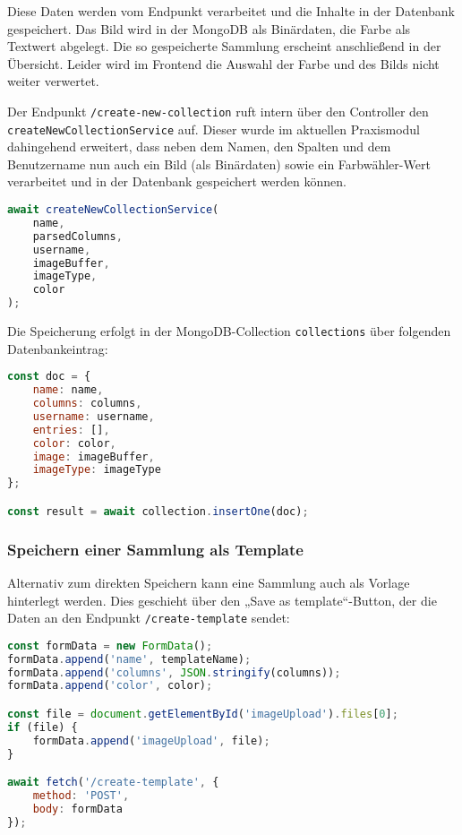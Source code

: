 Diese Daten werden vom Endpunkt  verarbeitet und die Inhalte in der Datenbank gespeichert.
Das Bild wird in der MongoDB als Binärdaten, die Farbe als Textwert abgelegt.
Die so gespeicherte Sammlung erscheint anschließend in der Übersicht.
Leider wird im Frontend die Auswahl der Farbe und des Bilds nicht weiter verwertet.

Der Endpunkt \texttt{/create-new-collection} ruft intern über den Controller den \texttt{createNewCollectionService} auf.
Dieser wurde im aktuellen Praxismodul dahingehend erweitert, dass neben dem Namen, den Spalten und dem Benutzername nun auch ein Bild (als Binärdaten) sowie ein Farbwähler-Wert verarbeitet und in der Datenbank gespeichert werden können.

\begin{lstlisting}[language=JavaScript, caption=Service-Aufruf im Controller]
await createNewCollectionService(
    name,
    parsedColumns,
    username,
    imageBuffer,
    imageType,
    color
);
\end{lstlisting}

Die Speicherung erfolgt in der MongoDB-Collection \texttt{collections} über folgenden Datenbankeintrag:

\begin{lstlisting}[language=JavaScript, caption=Dokumentstruktur im Service]
const doc = {
    name: name,
    columns: columns,
    username: username,
    entries: [],
    color: color,
    image: imageBuffer,
    imageType: imageType
};

const result = await collection.insertOne(doc);
\end{lstlisting}

\subsubsection{Speichern einer Sammlung als Template}\label{subsubsec:save-as-template}

Alternativ zum direkten Speichern kann eine Sammlung auch als Vorlage hinterlegt werden.
Dies geschieht über den „Save as template“-Button, der die Daten an den Endpunkt \texttt{/create-template} sendet:

\begin{lstlisting}[language=JavaScript, caption=Clientseitiges Speichern einer Sammlung als Vorlage]
const formData = new FormData();
formData.append('name', templateName);
formData.append('columns', JSON.stringify(columns));
formData.append('color', color);

const file = document.getElementById('imageUpload').files[0];
if (file) {
    formData.append('imageUpload', file);
}

await fetch('/create-template', {
    method: 'POST',
    body: formData
});
\end{lstlisting}

